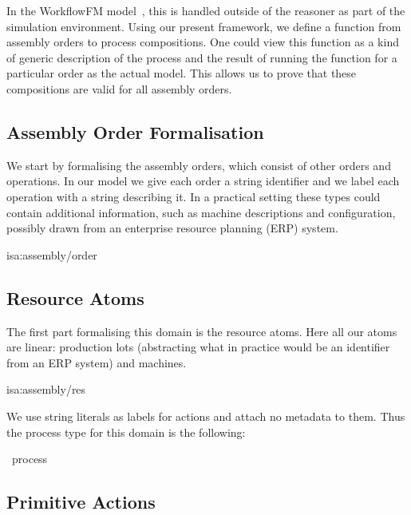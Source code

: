 \documentclass[class=smolathesis,crop=false]{standalone}
\begin{document}
In the WorkflowFM model~\cite{papapa_et_al-2021}, this is handled outside of the reasoner as part of the simulation environment.
Using our present framework, we define a function from assembly orders to process compositions.
One could view this function as a kind of generic description of the process and the result of running the function for a particular order as the actual model.
This allows us to prove that these compositions are valid for all assembly orders.

\subsection{Assembly Order Formalisation}
\label{sec:cases/assembly/formal-order}

We start by formalising the assembly orders, which consist of other orders and operations.
In our model we give each order a string identifier and we label each operation with a string describing it.
In a practical setting these types could contain additional information, such as machine descriptions and configuration, possibly drawn from an enterprise resource planning (ERP) system.
\begin{isadef}{isa:assembly/order}
  
\item
  
\end{isadef}

\subsection{Resource Atoms}
\label{sec:cases/assembly/res}

The first part formalising this domain is the resource atoms.
Here all our atoms are linear: production lots (abstracting what in practice would be an identifier from an ERP system) and machines.
\begin{isadef}{isa:assembly/res}
  
\end{isadef}

We use string literals as labels for actions and attach no metadata to them.
Thus the process type for this domain is the following:
\begin{isabelle}
\centering
  \ process
\end{isabelle}

\subsection{Primitive Actions}
\label{sec:cases/assembly/primitive}
\end{document}

